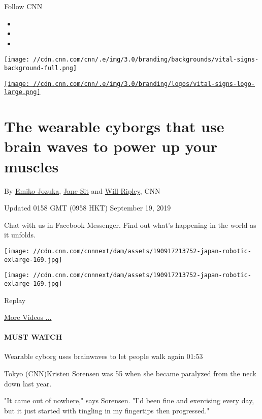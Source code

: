 Follow CNN

\begin{itemize}
\item
\item
\item
\end{itemize}

\texttt{[image: //cdn.cnn.com/cnn/.e/img/3.0/branding/backgrounds/vital-signs-background-full.png]}

\href{/specials/health/vital-signs}{\texttt{[image: //cdn.cnn.com/cnn/.e/img/3.0/branding/logos/vital-signs-logo-large.png]}}

\hypertarget{the-wearable-cyborgs-that-use-brain-waves-to-power-up-your-muscles}{%
\section{The wearable cyborgs that use brain waves to power up your
muscles}\label{the-wearable-cyborgs-that-use-brain-waves-to-power-up-your-muscles}}

By \href{/profiles/emiko-jozuka}{Emiko Jozuka},
\href{/profiles/jane-sit-profile}{Jane Sit} and
\href{/profiles/will-ripley}{Will Ripley}, CNN

Updated 0158 GMT (0958 HKT) September 19, 2019

Chat with us in Facebook Messenger. Find out what's happening in the
world as it unfolds.

\texttt{[image: //cdn.cnn.com/cnnnext/dam/assets/190917213752-japan-robotic-exlarge-169.jpg]}

\texttt{[image: //cdn.cnn.com/cnnnext/dam/assets/190917213752-japan-robotic-exlarge-169.jpg]}\href{javascript:void(0);}{}

Replay

\href{/videos}{More Videos ...}

\hypertarget{must-watch}{%
\paragraph{MUST WATCH}\label{must-watch}}

Wearable cyborg uses brainwaves to let people walk again 01:53

Tokyo (CNN)Kristen Sorensen was 55 when she became paralyzed from the
neck down last year.

"It came out of nowhere," says Sorensen. "I'd been fine and exercising
every day, but it just started with tingling in my fingertips then
progressed."

